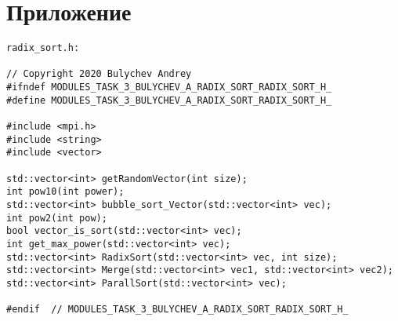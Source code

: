 \documentclass{report}
\begin{document}
\section*{Приложение}
\begin{lstlisting}
radix_sort.h:

// Copyright 2020 Bulychev Andrey
#ifndef MODULES_TASK_3_BULYCHEV_A_RADIX_SORT_RADIX_SORT_H_
#define MODULES_TASK_3_BULYCHEV_A_RADIX_SORT_RADIX_SORT_H_

#include <mpi.h>
#include <string>
#include <vector>

std::vector<int> getRandomVector(int size);
int pow10(int power);
std::vector<int> bubble_sort_Vector(std::vector<int> vec);
int pow2(int pow);
bool vector_is_sort(std::vector<int> vec);
int get_max_power(std::vector<int> vec);
std::vector<int> RadixSort(std::vector<int> vec, int size);
std::vector<int> Merge(std::vector<int> vec1, std::vector<int> vec2);
std::vector<int> ParallSort(std::vector<int> vec);

#endif  // MODULES_TASK_3_BULYCHEV_A_RADIX_SORT_RADIX_SORT_H_

\end{lstlisting}
\end{document}
